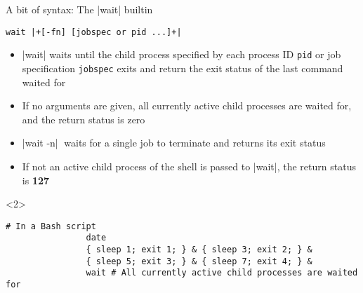 \begin{frame}[fragile]{A bit of syntax: The \bash|wait| builtin}
    \vspace{-1mm}
    \begin{overlayarea}{\textwidth}{0.7\textheight}
        \begin{lstlisting}[style=MyBash, numbers=none, belowskip=-6mm]
            wait |+[-fn] [jobspec or pid ...]+|
        \end{lstlisting}
        \begin{itemize}
            \item \alert<3>{\bash|wait| waits until the child process specified by each process ID \texttt{pid} or job specification \texttt{jobspec} exits and return the exit status of the last command waited for}
            \item \alert<2>{If no arguments are given, all currently active child processes are waited for, and the return status is zero}
            \item \alert<4>{\bash|wait -n|$\;$ waits for a single job to terminate and returns its exit status}
            \item \alert<5>{If not an active child process of the shell is passed to \bash|wait|, the return status is \textbf{127}}
        \end{itemize}
        \vspace{-2mm}
        \begin{onlyenv}<2>
            \begin{lstlisting}[style=MyBash, numbers=none, aboveskip=3mm]
                # In a Bash script
                date
                { sleep 1; exit 1; } & { sleep 3; exit 2; } &
                { sleep 5; exit 3; } & { sleep 7; exit 4; } &
                wait # All currently active child processes are waited for

\end{lstlisting}
\end{onlyenv}
\end{overlayarea}
\end{frame}
